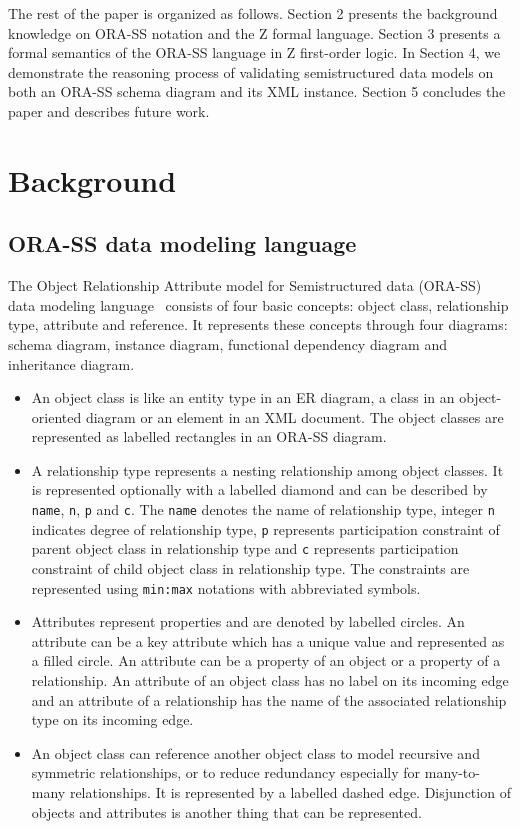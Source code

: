 \documentclass{entcs}
\begin{document}
The rest of the paper is organized as follows. Section 2 presents
the background knowledge on ORA-SS notation and the Z formal
language. Section 3 presents a formal semantics of the ORA-SS
language in Z first-order logic. In Section 4, we demonstrate the
reasoning process of validating semistructured data models on both
an ORA-SS schema diagram and its XML instance. Section 5 concludes
the paper and describes future work.

\section{Background}
\subsection{ORA-SS data modeling language}
The Object Relationship Attribute model for Semistructured data
(ORA-SS) data modeling language~\cite{dobbie01orass,ling05}
consists of four basic concepts: object class, relationship type,
attribute and reference. It represents these concepts through four
diagrams: schema diagram, instance diagram, functional dependency
diagram and inheritance diagram.
\begin{itemize}
 \item An object class is like an entity
type in an ER diagram, a class in an object-oriented diagram or an
element in an XML document. The object classes are represented as
labelled rectangles in an ORA-SS diagram.
 \item A relationship type represents a nesting relationship among
object classes. It is represented optionally with a labelled
diamond and can be described by \texttt{name}, \texttt{n},
\texttt{p} and \texttt{c}. The \texttt{name} denotes the name of
relationship type, integer \texttt{n} indicates degree of
relationship type, \texttt{p} represents participation constraint
of parent object class in relationship type and \texttt{c}
represents participation constraint of child object class in
relationship type. The constraints are represented using
\texttt{min:max} notations with abbreviated symbols.
 \item  Attributes represent properties and are denoted by labelled circles.
An attribute can be a key attribute which has a unique value and
represented as a filled circle. An attribute can be a property of
an object or a property of a relationship. An attribute of an
object class has no label on its incoming edge and an attribute of
a relationship has the name of the associated relationship type on
its incoming edge.
 \item An object class can reference another object class
to model recursive and symmetric relationships, or to reduce
redundancy especially for many-to-many relationships. It is
represented by a labelled dashed edge. Disjunction of objects and
attributes is another thing that can be represented.
\end{itemize}
\end{document}
